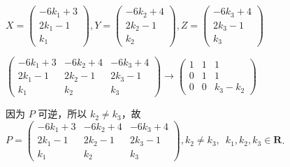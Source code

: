 \begin{enumerate}
\begin{enumerate}
                    $X = \begin{pmatrix}-6k_1+3 \\ 2k_1-1 \\ k_1\end{pmatrix},Y = \begin{pmatrix}-6k_2+4 \\ 2k_2-1 \\ k_2\end{pmatrix},Z = \begin{pmatrix}-6k_3+4 \\ 2k_3-1 \\ k_3\end{pmatrix}$

                    $\begin{pmatrix}-6k_1+3 & -6k_2+4 & -6k_3+4 \\ 2k_1-1 & 2k_2-1 & 2k_3-1 \\ k_1 & k_2 & k_3\end{pmatrix}\rightarrow \begin{pmatrix}1 & 1 & 1 \\ 0 & 1 & 1 \\ 0 & 0 & k_3-k_2\end{pmatrix}$

                    因为 $P$ 可逆，所以 $k_2\neq k_3$，故 $P=\begin{pmatrix}-6k_1+3 & -6k_2+4 & -6k_3+4 \\ 2k_1-1 & 2k_2-1 & 2k_3-1 \\ k_1 & k_2 & k_3\end{pmatrix},k_2\neq k_3,\enspace k_1,k_2,k_3 \in \mathbf{R}$.
          \end{enumerate}
\end{enumerate}

